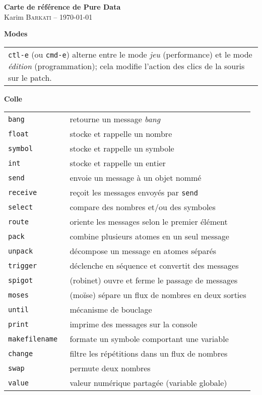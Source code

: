 \documentclass[a4paper, landscape, 10pt]{article}
\newcommand{\puredata}{Pure Data\xspace}
\newcommand{\refcardtitle}[1]{
  \begin{center}
    \textbf{\small{#1}} %
  \end{center}
}
\begin{document}
\begin{multicols}{3}

  \begin{center}
    \Large{\textbf{Carte de référence de \puredata}} \\
    \small{Karim \textsc{Barkati} -- \today} 
  \end{center}

  \footnotesize

  \refcardtitle{Modes}
  \begin{tabularx}{9.1cm}{X}
    \texttt{ctl-e} (ou \texttt{cmd-e}) alterne entre le mode \emph{jeu} (performance) et le mode \emph{édition} (programmation); cela modifie l'action des clics de la souris sur le patch.%
  \end{tabularx}
  \refcardtitle{Colle}
  \begin{tabularx}{9cm}{>{\tt}l X}
    bang & retourne un message \emph{bang} \\
    float & stocke et rappelle un nombre \\
    symbol & stocke et rappelle un symbole \\
    int & stocke et rappelle un entier \\
    send & envoie un message à un objet nommé \\
    receive & reçoit les messages envoyés par \texttt{send} \\
    select & compare des nombres et/ou des symboles \\
    route & oriente les messages selon le premier élément \\
    pack & combine plusieurs atomes en un seul message \\
    unpack & décompose un message en atomes séparés \\
    trigger & déclenche en séquence et convertit des messages \\
    spigot & (robinet) ouvre et ferme le passage de messages \\
    moses & (moïse) sépare un flux de nombres en deux sorties \\
    until & mécanisme de bouclage \\
    print & imprime des messages sur la console \\
    makefilename & formate un symbole comportant une variable \\
    change & filtre les répétitions dans un flux de nombres \\
    swap & permute deux nombres \\
    value & valeur numérique partagée (variable globale) \\
  \end{tabularx}



\end{multicols}
\end{document}
